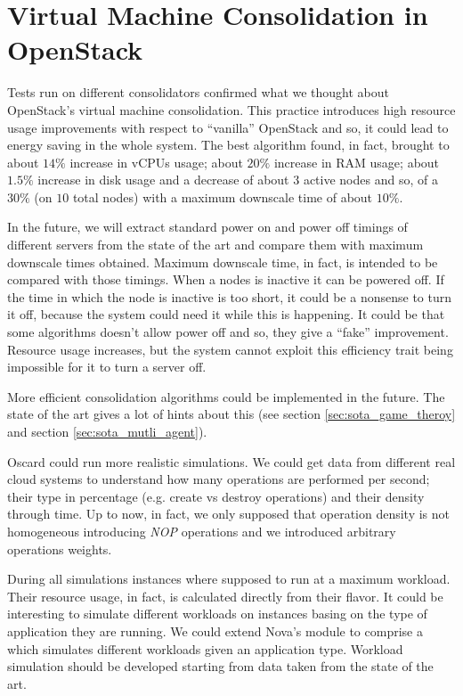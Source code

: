 \section{Virtual Machine Consolidation in OpenStack}
\label{sec:conc_cons}
Tests run on different consolidators confirmed what we thought about OpenStack's virtual machine consolidation. This practice introduces high resource usage improvements with respect to ``vanilla'' OpenStack and so, it could lead to energy saving in the whole system. The best algorithm found, in fact, brought to about $14\%$ increase in vCPUs usage; about $20\%$ increase in RAM usage; about $1.5\%$ increase in disk usage and a decrease of about $3$ active nodes and so, of a $30\%$ (on $10$ total nodes) with a maximum downscale time of about $10\%$.

In the future, we will extract standard power on and power off timings of different servers from the state of the art and compare them with maximum downscale times obtained. Maximum downscale time, in fact, is intended to be compared with those timings. When a nodes is inactive it can be powered off. If the time in which the node is inactive is too short, it could be a nonsense to turn it off, because the system could need it while this is happening. It could be that some algorithms doesn't allow power off and so, they give a ``fake'' improvement. Resource usage increases, but the system cannot exploit this efficiency trait being impossible for it to turn a server off.

More efficient consolidation algorithms could be implemented in the future. The state of the art gives a lot of hints about this (see section \ref{sec:sota_game_theroy} and section \ref{sec:sota_mutli_agent}). 

Oscard could run more realistic simulations. We could get data from different real cloud systems to understand how many operations are performed per second; their type in percentage (e.g. create vs destroy operations) and their density through time. Up to now, in fact, we only supposed that operation density is not homogeneous introducing \textit{NOP} operations and we introduced arbitrary operations weights.

During all simulations instances where supposed to run at a maximum workload. Their resource usage, in fact, is calculated directly from their flavor. It could be interesting to simulate different workloads on instances basing on the type of application they are running. We could extend Nova's  module to comprise a  which simulates different workloads given an application type. Workload simulation should be developed starting from data taken from the state of the art.

